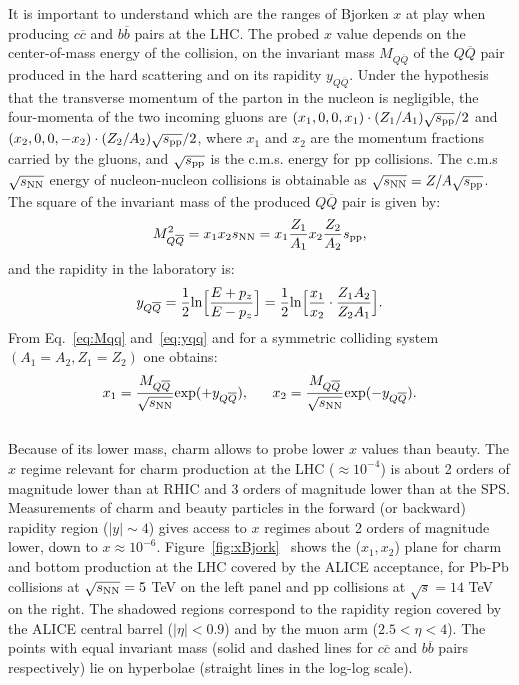 It is important to understand which are the ranges of Bjorken $x$
at play when producing $c\overline{c}$ and $b\overline{b}$ pairs at the LHC. 
The probed $x$ value depends on the center-of-mass energy
of the collision, on the invariant mass $M_{Q\overline{Q}}$ of the 
$Q\overline{Q}$ pair produced in the hard scattering
and on its rapidity $y_{Q\overline{Q}}$. Under the hypothesis 
that the transverse momentum of the parton 
in the nucleon is negligible, the four-momenta of the two 
incoming gluons are $(x_1,0,0,x_1)\cdot(Z_1/A_1)\sqrt{s_{\rm pp}}/2$
and $(x_2,0,0,-x_2)\cdot(Z_2/A_2)\sqrt{s_{\rm pp}}/2$, where 
$x_1$ and $x_2$ are the momentum fractions 
carried by the gluons, and $\sqrt{s_{\rm pp}}$ is the c.m.s. energy for pp collisions.
The c.m.s $\sqrt{s_{\rm NN}}$ energy of nucleon-nucleon collisions is obtainable as $\sqrt{s_{\rm NN}}=Z/A\sqrt{s_{\rm pp}}$.
The square of the invariant mass of the produced $Q\overline{Q}$ pair is given by:
\begin{equation}
\label{eq:Mqq}
M_{Q\overline{Q}}^2 =  x_1 x_2 s_{\rm NN} = x_1 \frac{Z_1}{A_1} x_2 \frac{Z_2}{A_2} s_{\rm pp},
\end{equation}
and the rapidity in the laboratory is:
\begin{equation}
\label{eq:yqq}
y_{Q\overline{Q}} = \frac{1}{2} {\rm ln} {\Big [ } \frac{E +p_z}{E-p_z}  {\Big ] }= \frac{1}{2} {\rm ln} {\Big [ } \frac{x_1}{x_2} \cdot \frac{Z_1 A_2}{Z_2 A_1} {\Big ] }.    
\end{equation}
From Eq.~\ref{eq:Mqq} and~\ref{eq:yqq} and for a symmetric colliding system $(A_1 = A_2, Z_1 = Z_2)$
one obtains:
\begin{equation}
\label{eq:x1x2}
x_1 = \frac{M_{Q\overline{Q}}}{\sqrt{s_{\rm NN}}} {\rm exp} (+y_{Q\overline{Q}} ), \; \; \; \; \; \;
x_2 = \frac{M_{Q\overline{Q}}}{\sqrt{s_{\rm NN}}} {\rm exp} (-y_{Q\overline{Q}} ). 
\end{equation}\\




Because of its lower mass, charm allows to probe lower $x$ values than beauty. 
The $x$ regime relevant for charm production at the LHC ($\approx 10^{-4}$) is about 
2 orders of magnitude lower than at RHIC and 3 orders of magnitude lower than at the SPS.
Measurements of charm and beauty particles in the forward (or backward) rapidity region ($|y| \sim 4 $) 
gives access to $x$ regimes about 2 orders of magnitude lower, down to $x \approx 10^{-6}$.
Figure~\ref{fig:xBjork}~\cite{Alessandro:2006yt} shows the ($x_1, x_2$) 
plane for charm and bottom production at the LHC
covered by the ALICE acceptance, for Pb-Pb
collisions at $\sqrt{s_{\rm NN}} = 5$ TeV on the left panel and pp collisions 
at $\sqrt{s} = 14$ TeV on the right.
The shadowed regions correspond to the rapidity region covered 
by the ALICE central barrel ($|\eta| < 0.9$) and by the 
muon arm ($2.5 < \eta < 4$).
The points with equal invariant mass (solid and dashed lines for $c\overline{c}$ and $b\overline{b}$ pairs respectively) 
lie on hyperbolae (straight lines in the log-log scale).\\


